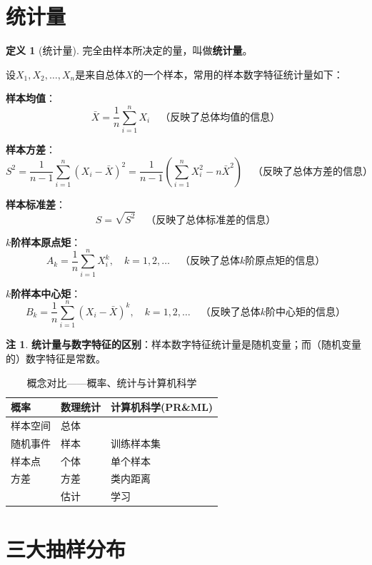 \documentclass[11pt,a4paper]{report}
\theoremstyle{definition}
\newtheorem{definition}{定义}[chapter]
\newtheorem{remark}{注}[chapter]
\theoremstyle{plain}
\begin{document}
\section{统计量}

\begin{definition}[统计量]
完全由样本所决定的量，叫做\textbf{统计量}。
\end{definition}

设$X_1,X_2,\ldots,X_n$是来自总体$X$的一个样本，常用的样本数字特征统计量如下：

\textbf{样本均值}：
\[
\bar{X}=\frac{1}{n}\sum_{i=1}^{n}X_i
\quad\text{（反映了总体均值的信息）}
\]

\textbf{样本方差}：
\[
S^2=\frac{1}{n-1}\sum_{i=1}^{n}(X_i-\bar{X})^2
=\frac{1}{n-1}\left(\sum_{i=1}^{n}X_i^2-n\bar{X}^2\right)
\quad\text{（反映了总体方差的信息）}
\]

\textbf{样本标准差}：
\[
S=\sqrt{S^2}
\quad\text{（反映了总体标准差的信息）}
\]

\textbf{$k$阶样本原点矩}：
\[
A_k=\frac{1}{n}\sum_{i=1}^{n}X_i^k,\quad k=1,2,\ldots
\quad\text{（反映了总体$k$阶原点矩的信息）}
\]

\textbf{$k$阶样本中心矩}：
\[
B_k=\frac{1}{n}\sum_{i=1}^{n}(X_i-\bar{X})^k,\quad k=1,2,\ldots
\quad\text{（反映了总体$k$阶中心矩的信息）}
\]

\begin{remark}
\textbf{统计量与数字特征的区别}：样本数字特征统计量是随机变量；而（随机变量的）数字特征是常数。
\end{remark}

\begin{table}[htbp]
\centering
\caption{概念对比——概率、统计与计算机科学}
\begin{tabular}{@{}lll@{}}
\toprule
\textbf{概率} & \textbf{数理统计} & \textbf{计算机科学(PR\&ML)} \\
\midrule
样本空间 & 总体 & \\
随机事件 & 样本 & 训练样本集 \\
样本点 & 个体 & 单个样本 \\
方差 & 方差 & 类内距离 \\
& 估计 & 学习 \\
\bottomrule
\end{tabular}
\end{table}

\section{三大抽样分布}
\end{document}
